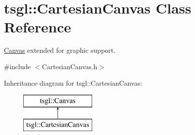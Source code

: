 \hypertarget{classtsgl_1_1_cartesian_canvas}{}\section{tsgl\+:\+:Cartesian\+Canvas Class Reference}
\label{classtsgl_1_1_cartesian_canvas}


\hyperlink{classtsgl_1_1_canvas}{Canvas} extended for graphic support.  




{\ttfamily \#include $<$Cartesian\+Canvas.\+h$>$}

Inheritance diagram for tsgl\+:\+:Cartesian\+Canvas\+:\begin{figure}[H]
\begin{center}
\leavevmode
\includegraphics[height=2.000000cm]{classtsgl_1_1_cartesian_canvas}
\end{center}
\end{figure}
